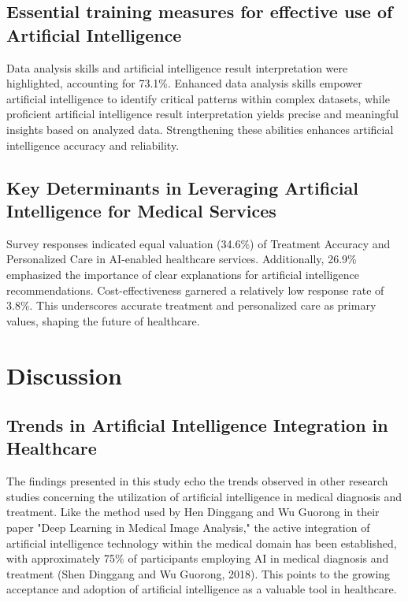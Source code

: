 \documentclass{ieeeaccess}
\begin{document}
\subsection{Essential training measures for effective use of Artificial Intelligence}
Data analysis skills and artificial intelligence result interpretation were highlighted, accounting for 73.1\%. Enhanced data analysis skills empower artificial intelligence to identify critical patterns within complex datasets, while proficient artificial intelligence result interpretation yields precise and meaningful insights based on analyzed data. Strengthening these abilities enhances artificial intelligence accuracy and reliability.

\subsection{Key Determinants in Leveraging Artificial Intelligence for Medical Services}
Survey responses indicated equal valuation (34.6\%) of Treatment Accuracy and Personalized Care in AI-enabled healthcare services. Additionally, 26.9\% emphasized the importance of clear explanations for artificial intelligence recommendations. Cost-effectiveness garnered a relatively low response rate of 3.8\%. This underscores accurate treatment and personalized care as primary values, shaping the future of healthcare.


\section{Discussion}
\subsection{Trends in Artificial Intelligence Integration in Healthcare}
The findings presented in this study echo the trends observed in other research studies concerning the utilization of artificial intelligence in medical diagnosis and treatment. Like the method used by Hen Dinggang and Wu Guorong in their paper "Deep Learning in Medical Image Analysis," the active integration of artificial intelligence technology within the medical domain has been established, with approximately 75\% of participants employing AI in medical diagnosis and treatment (Shen Dinggang and Wu Guorong, 2018). This points to the growing acceptance and adoption of artificial intelligence as a valuable tool in healthcare.
\end{document}
